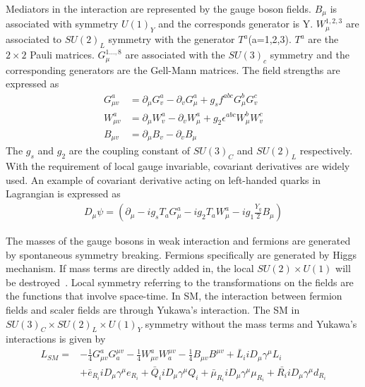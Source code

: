 Mediators in the interaction are represented by the gauge boson fields. $B_{\mu}$ is associated with symmetry $U(1)_{Y}$ and the corresponds generator is Y. $W_{\mu}^{1,2,3}$ are associated to $SU(2)_{L}$ symmetry with the generator $T^{a}$(a=1,2,3). $T^{a}$ are the $2\times2$ Pauli matrices. $G_{\mu}^{1...,8}$ are associated with the $SU(3)_{c}$ symmetry and the corresponding generators are the Gell-Mann matrices.  The field strengths are expressed as 
\begin{equation}
  \begin{aligned}
G^{a}_{\mu v}&=\partial_{\mu}G^{a}_{v}-\partial_{v}G^{a}_{\mu}+g_{s}f^{abc}G^{b}_{\mu}G^{c}_{v}\\
W^{a}_{\mu v}&=\partial_{\mu}W^{a}_{v}-\partial_{v}W^{a}_{\mu}+g_{2}\epsilon^{abc}W^{b}_{\mu}W^{c}_{v}\\
B_{\mu v}       &=\partial_{\mu}B_{v}-\partial_{v}B_{\mu}
  \end{aligned}
\end{equation}
The $g_{s}$ and $g_{2}$ are the coupling constant of $SU(3)_{C}$ and $SU(2)_{L}$ respectively. With the requirement of local gauge invariable, covariant derivatives are widely used. An example of covariant derivative acting on left-handed quarks in Lagrangian is expressed as
\begin{equation}
  \begin{aligned}
D_{\mu}\psi = (\partial_{\mu}-ig_{s}T_{a}G^{a}_{\mu}-ig_{2}T_{a}W^{a}_{\mu}-ig_{1}\frac{Y_{q}}{2}B_{\mu})
  \end{aligned}
\end{equation} 


The masses of the gauge bosons in weak interaction and fermions are generated by spontaneous symmetry breaking. Fermions specifically are generated by Higgs mechanism.  If mass terms are directly added in, the local $SU(2)\times U(1)$ will be destroyed~\cite{DJOUADI20081}. Local symmetry referring to the transformations on the fields are the functions that involve space-time. In SM, the interaction between fermion fields and scaler fields are through Yukawa's interaction.  The SM in $SU(3)_{C}\times SU(2)_{L}\times U(1)_{Y}$ symmetry without the mass terms and Yukawa's interactions is given by
 \begin{equation}
  \begin{aligned}
L_{SM}=&-\frac{1}{4}G^{a}_{\mu v}G^{\mu v}_{a}-\frac{1}{4}W^{a}_{\mu v}W^{\mu v}_{a}-\frac{1}{4}B_{\mu v}B^{\mu v}+\bar{L}_{i}iD_{\mu}\gamma^{\mu}L_{i}\\
              &+\bar{e}_{R_{i}}iD_{\mu}\gamma^{\mu}e_{R_{i}}+\bar{Q}_{i}iD_{\mu}\gamma^{\mu}Q_{i}+\bar{\mu}_{R_{i}}iD_{\mu}\gamma^{\mu}\mu_{R_{i}}+\bar{R_{i}}iD_{\mu}\gamma^{\mu}d_{R_{i}}
  \end{aligned}
\end{equation} 






